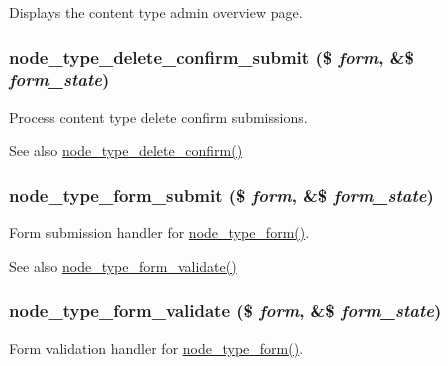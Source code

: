 \label{content__types_8inc_a9530bf9d596b557e8c77f196960dde84}
Displays the content type admin overview page. \hypertarget{content__types_8inc_aef7aa2855944bc4869a9956736b2845a}{
\subsubsection[{node\_\-type\_\-delete\_\-confirm\_\-submit}]{\setlength{\rightskip}{0pt plus 5cm}node\_\-type\_\-delete\_\-confirm\_\-submit (\$ {\em form}, \/  \&\$ {\em form\_\-state})}}
\label{content__types_8inc_aef7aa2855944bc4869a9956736b2845a}
Process content type delete confirm submissions.

\begin{DoxySeeAlso}{See also}
\hyperlink{group__forms_ga1ecf3ba8b8cb5469096a74f3e4f18546}{node\_\-type\_\-delete\_\-confirm()} 
\end{DoxySeeAlso}
\hypertarget{content__types_8inc_afa55f7240b05f2a2804c11766228a5af}{
\subsubsection[{node\_\-type\_\-form\_\-submit}]{\setlength{\rightskip}{0pt plus 5cm}node\_\-type\_\-form\_\-submit (\$ {\em form}, \/  \&\$ {\em form\_\-state})}}
\label{content__types_8inc_afa55f7240b05f2a2804c11766228a5af}
Form submission handler for \hyperlink{group__forms_ga488f2cb519f924aa0bd9579d9bb0db49}{node\_\-type\_\-form()}.

\begin{DoxySeeAlso}{See also}
\hyperlink{content__types_8inc_a9bce2bd1a17217d5573cdc8b4465c1f9}{node\_\-type\_\-form\_\-validate()} 
\end{DoxySeeAlso}
\hypertarget{content__types_8inc_a9bce2bd1a17217d5573cdc8b4465c1f9}{
\subsubsection[{node\_\-type\_\-form\_\-validate}]{\setlength{\rightskip}{0pt plus 5cm}node\_\-type\_\-form\_\-validate (\$ {\em form}, \/  \&\$ {\em form\_\-state})}}
\label{content__types_8inc_a9bce2bd1a17217d5573cdc8b4465c1f9}
Form validation handler for \hyperlink{group__forms_ga488f2cb519f924aa0bd9579d9bb0db49}{node\_\-type\_\-form()}.

